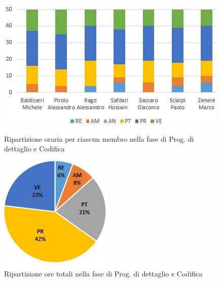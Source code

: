 \begin{figure}[!htb]
   \begin{minipage}{0.6\textwidth}
     \centering
     \includegraphics{Images/PO-Codifica}
     \caption{Ripartizione oraria per ciascun membro nella fase di Prog. di dettaglio e Codifica}
   \end{minipage}\hspace{0.1\textwidth}
   \begin{minipage}{0.3\textwidth}
     \centering
     \includegraphics[width=.9\textwidth]{Images/PE-Codifica}
     \captionsetup{width=.9\textwidth}
     \caption{Ripartizione ore totali nella fase di Prog. di dettaglio e Codifica}
   \end{minipage}
\end{figure}